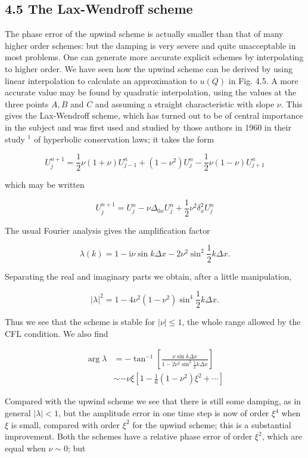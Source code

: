 \documentclass[10pt]{article}
\begin{document}
\subsection*{4.5 The Lax-Wendroff scheme}
The phase error of the upwind scheme is actually smaller than that of many higher order schemes: but the damping is very severe and quite unacceptable in most problems. One can generate more accurate explicit schemes by interpolating to higher order. We have seen how the upwind scheme can be derived by using linear interpolation to calculate an approximation to \(u(Q)\) in Fig. 4.5. A more accurate value may be found by quadratic interpolation, using the values at the three points \(A, B\) and \(C\) and assuming a straight characteristic with slope \(\nu\). This gives the Lax-Wendroff scheme, which has turned out to be of central importance in the subject and was first used and studied by those authors in 1960 in their study \({ }^{1}\) of hyperbolic conservation laws; it takes the form

\[
U_{j}^{n+1}=\frac{1}{2} \nu(1+\nu) U_{j-1}^{n}+\left(1-\nu^{2}\right) U_{j}^{n}-\frac{1}{2} \nu(1-\nu) U_{j+1}^{n}
\]

which may be written

\[
U_{j}^{n+1}=U_{j}^{n}-\nu \Delta_{0 x} U_{j}^{n}+\frac{1}{2} \nu^{2} \delta_{x}^{2} U_{j}^{n}
\]

The usual Fourier analysis gives the amplification factor

\[
\lambda(k)=1-\mathrm{i} \nu \sin k \Delta x-2 \nu^{2} \sin ^{2} \frac{1}{2} k \Delta x .
\]

Separating the real and imaginary parts we obtain, after a little manipulation,

\[
|\lambda|^{2}=1-4 \nu^{2}\left(1-\nu^{2}\right) \sin ^{4} \frac{1}{2} k \Delta x .
\]

Thus we see that the scheme is stable for \(|\nu| \leq 1\), the whole range allowed by the CFL condition. We also find

\[
\begin{aligned}
\arg \lambda & =-\tan ^{-1}\left[\frac{\nu \sin k \Delta x}{1-2 \nu^{2} \sin ^{2} \frac{1}{2} k \Delta x}\right] \\
& \sim-\nu \xi\left[1-\frac{1}{6}\left(1-\nu^{2}\right) \xi^{2}+\cdots\right]
\end{aligned}
\]

Compared with the upwind scheme we see that there is still some damping, as in general \(|\lambda|<1\), but the amplitude error in one time step is now of order \(\xi^{4}\) when \(\xi\) is small, compared with order \(\xi^{2}\) for the upwind scheme; this is a substantial improvement. Both the schemes have a relative phase error of order \(\xi^{2}\), which are equal when \(\nu \sim 0\); but
\end{document}
